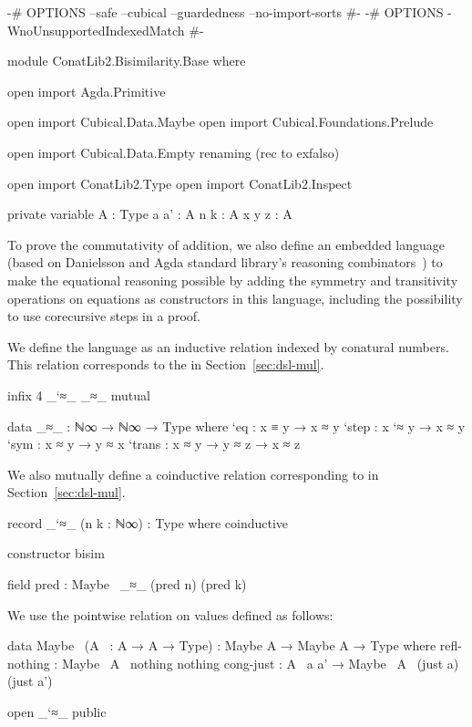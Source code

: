 \begin{code}[hide]
{-# OPTIONS --safe --cubical --guardedness --no-import-sorts #-}
{-# OPTIONS -WnoUnsupportedIndexedMatch #-}

module ConatLib2.Bisimilarity.Base where

open import Agda.Primitive

open import Cubical.Data.Maybe
open import Cubical.Foundations.Prelude

open import Cubical.Data.Empty
  renaming (rec to exfalso)

open import ConatLib2.Type
open import ConatLib2.Inspect

private variable
  A : Type
  a a' : A
  n k : A
  x y z : A
\end{code}
To prove the commutativity of addition, we also define an embedded language
(based on Danielsson \cite{danielsson-beating} and Agda standard library's
 reasoning combinators~\cite{agda-stdlib}) to make the
equational reasoning possible by adding the symmetry and transitivity operations
on equations as constructors in this language, including the possibility to use
corecursive steps in a proof.

We define the language as an inductive relation indexed by conatural numbers.
This relation corresponds to the  in
Section~\ref{sec:dsl-mul}.
\begin{code}[hide]
infix 4 _`≈_ _≈_
mutual
\end{code}
\begin{code}
  data _≈_ : ℕ∞ → ℕ∞ → Type where
    `eq     : x ≡ y → x ≈ y
    `step   : x `≈ y → x ≈ y
    `sym    : x ≈ y → y ≈ x
    `trans  : x ≈ y → y ≈ z → x ≈ z
\end{code}
\begin{AgdaMultiCode}%
We also mutually define a coinductive relation corresponding to
 in Section~\ref{sec:dsl-mul}.
\begin{code}
  record _`≈_ (n k : ℕ∞) : Type where
    coinductive
\end{code}
\begin{code}[hide]
    constructor bisim
\end{code}
\begin{code}
    field
      pred : Maybe~ _≈_ (pred n) (pred k)
\end{code}
\end{AgdaMultiCode}
We use the pointwise relation on  values defined as follows:
\begin{code}
  data Maybe~ (A~ : A → A → Type) :
    Maybe A → Maybe A → Type
    where
      refl-nothing : Maybe~ A~ nothing nothing
      cong-just : A~ a a' → Maybe~ A~ (just a) (just a')
\end{code}
\begin{code}[hide]
open _`≈_ public
\end{code}

